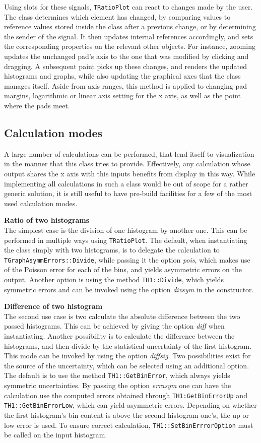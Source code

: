 Using slots for these signals, \texttt{TRatioPlot} can react to changes made by the user. The class
determines which element has changed, by comparing values to reference values stored inside the 
class after a previous change, or by determining the sender of the signal. It then updates internal
references accordingly, and sets the corresponding properties on the relevant other objects. For instance,
zooming updates the unchanged pad's axis to the one that was modified by clicking and dragging. A subsequent
paint picks up these changes, and renders the updated histograms and graphs, while also updating the
graphical axes that the class manages itself. Aside from axis ranges, this method is applied to changing
pad margins, logarithmic or linear axis setting for the x axis, as well as the point where the pads meet.

\subsection{Calculation modes}
A large number of calculations can be performed, that lend itself to visualization in the manner that
this class tries to provide. Effectively, any calculation whose output shares the x axis with this
inputs benefits from display in this way. While implementing all calculations in such a class would
be out of scope for a rather generic solution, it is still useful to have pre-build facilities for 
a few of the most used calculation modes. 

\textbf{Ratio of two histograms}\\
The simplest case is the division of one histogram by another one. This can be performed in multiple
ways using \texttt{TRatioPlot}. The default, when instantiating the class simply with two histograms,
is to delegate the calculation to \texttt{TGraphAsymmErrors::Divide}, while passing it the option
\emph{pois}, which makes use of the Poisson error for each of the bins, and yields asymmetric errors on
the output. Another option is using the method \texttt{TH1::Divide}, which yields symmetric errors
and can be invoked using the option \emph{divsym} in the constructor.

\textbf{Difference of two histogram}\\
The second use case is two calculate the absolute difference between the two passed histograms.
This can be achieved by giving the option \emph{diff} when instantiating. Another possibility is 
to calculate the difference between the histograms, and then divide by the statistical uncertainty of
the first histogram. This mode can be invoked by using the option \emph{diffsig}. Two possibilities
exist for the source of the uncertainty, which can be selected using an additional option. The default is
to use the method \texttt{TH1::GetBinError}, which always yields symmetric uncertainties. By passing
the option \emph{errasym} one can have the calculation use the computed errors obtained through
\texttt{TH1:GetBinErrorUp} and \texttt{TH1::GetBinErrorLow}, which can yield asymmetric errors. Depending
on whether the first histogram's bin content is above the second histogram one's, the up or low
error is used. To ensure correct calculation, \texttt{TH1::SetBinErrrorOption} must be called on the
input histogram.

